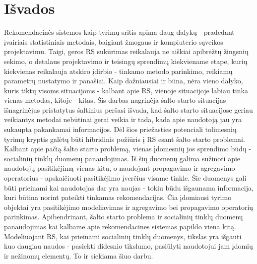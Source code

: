 \documentclass{VUMIFInfMagistrinis}
\begin{document}
\section{Išvados}
Rekomendacinės sistemos kaip tyrimų sritis apima daug dalykų - pradedant įvairiais statistiniais metodais, baigiant žmogaus ir kompiuterio sąveikos projektavimu. Taigi, geros RS sukūrimas reikalauja ne aiškiai apibrėžtų žingsnių sekimo, o detalaus projektavimo ir teisingų sprendimų kiekviename etape, kurių kiekvienas reikalauja atskiro įdirbio - tinkamo metodo parinkimo, reikiamų parametrų nustatymo ir panašiai. 
\newline
\indent
Kaip dažniausiai ir būna, nėra vieno dalyko, kuris tiktų visoms situacijoms - kalbant apie RS, vienoje situacijoje labiau tinka vienas metodas, kitoje - kitas. Šis darbas nagrinėja šalto starto situacijas - išnagrinėjus pristatytus šaltinius peršasi išvada, kad šalto starto situacijose geriau veikiantys metodai nebūtinai gerai veikia ir tada, kada apie naudotoją jau yra sukaupta pakankamai informacijos. Dėl šios priežasties potenciali tolimesnių tyrimų kryptis galėtų būti hibridinis požiūris į RS esant šalto starto problemai.
\newline
\indent
Kalbant apie pačią šalto starto problemą, vienas įdomesnių jos sprendimo būdų - socialinių tinklų duomenų panaudojimas. Iš šių duomenų galima sužinoti apie naudotojų pasitikėjimą vienas kitu, o naudojant propagavimo ir agregavimo operatorius - apskaičiuoti pasitikėjimo įverčius visame tinkle. Šie duomenys gali būti prieinami kai naudotojas dar yra naujas - tokiu būdu išgaunama informacija, kuri būtina norint pateikti tinkamas rekomendacijas. Čia įdomiausi tyrimo objektai yra pasitikėjimo modeliavimas ir agregavimo bei propagavimo operatorių parinkimas.
\newline
\indent
Apibendrinant, šalto starto problema ir socialinių tinklų duomenų panaudojimas kai kalbame apie rekomendacines sistemas papildo viena kitą. Modeliuojant RS, kai prieinami socialinių tinklų duomenys, tikslas yra išgauti kuo daugiau naudos - pasiekti didesnio tikslumo, pasiūlyti naudotojui jam įdomių ir nežinomų elementų. To ir siekiama šiuo darbu.
\end{document}
